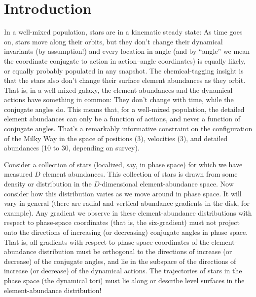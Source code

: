 \documentclass[modern]{aastex63}
\begin{document}

\section{Introduction}

In a well-mixed population, stars are in a kinematic steady state:
As time goes on, stars move along their orbits, but they don't change their dynamical
invariants (by assumption!) and every location in angle (and by ``angle'' we mean the
coordinate conjugate to action in action--angle coordinates) is equally likely, or
equally probably populated in any snapshot.
The chemical-tagging insight is that the stars also don't change their surface element
abundances as they orbit.
That is, in a well-mixed galaxy, the element abundances and the dynamical actions have
something in common:
They don't change with time, while the conjugate angles do.
This means that, for a well-mixed population, the detailed element abundances can only
be a function of actions, and never a function of conjugate angles.
That's a remarkably informative constraint on the configuration of the Milky Way in
the space of positions (3), velocities (3), and detailed abundances (10 to 30, depending
on survey).

Consider a collection of stars (localized, say, in phase space) for which we have
measured $D$ element abundances.
This collection of stars is drawn from some density or distribution in
the $D$-dimensional element-abundance space.
Now consider how this distribution varies as we move around in phase space.
It will vary in general (there are radial and vertical abundance gradients in the
disk, for example).
Any gradient we observe in these element-abundance distributions with respect to
phase-space coordinates (that is, the six-gradient) must not project
onto the directions of increasing (or decreasing) conjugate angles in phase space.
That is, all gradients with respect to phase-space coordinates
of the element-abundance distribution must be orthogonal to the
directions of increase (or decrease) of the conjugate angles, and lie in the subspace
of the directions of increase (or decrease) of the dynamical actions.
The trajectories of stars in the phase space (the dynamical tori) must lie along or
describe level surfaces in the element-abundance distribution!
\end{document}
